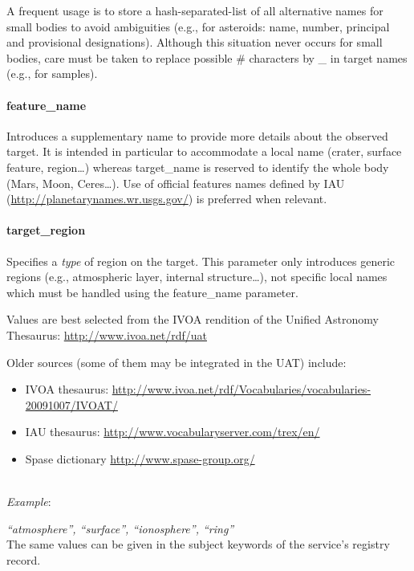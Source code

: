 \documentclass[11pt,a4paper]{ivoa}
\begin{document}
A frequent usage is to store a hash-separated-list of all alternative
names for small bodies to avoid ambiguities (e.g., for asteroids: name,
number, principal and provisional designations). Although this situation
never occurs for small bodies, care must be taken to replace possible \#
characters by \_ in target names (e.g., for samples).

\paragraph{feature\_name}
\label{par:feature_name}

Introduces a supplementary name to provide more details
about the observed target. It is intended in particular to
accommodate a local name (crater, surface feature, region…)
whereas target\_name is reserved to identify the whole body
(Mars, Moon, Ceres…). Use of official features names defined by IAU
(\url{http://planetarynames.wr.usgs.gov/})
is preferred when relevant.

\paragraph{target\_region}

Specifies a \emph{type} of region on the target. This parameter
only introduces generic regions  (e.g., atmospheric layer, internal
structure…), not specific local names which must be handled using the
feature\_name parameter.

Values are best selected from the IVOA
rendition of the Unified Astronomy Thesaurus:
\url{http://www.ivoa.net/rdf/uat}

Older sources (some of them may be integrated in the UAT) include:

\begin{itemize}
\item IVOA thesaurus:
      \url{http://www.ivoa.net/rdf/Vocabularies/vocabularies-20091007/IVOAT/}
\item IAU thesaurus:
      \url{http://www.vocabularyserver.com/trex/en/}
\item Spase dictionary \url{http://www.spase-group.org/}
\end{itemize}

\textbf{\\}
\emph{Example}:

\emph{``atmosphere'', ``surface'', ``ionosphere'', ``ring''}\\
The same values can be given in the subject keywords of the service's registry record.
\end{document}
